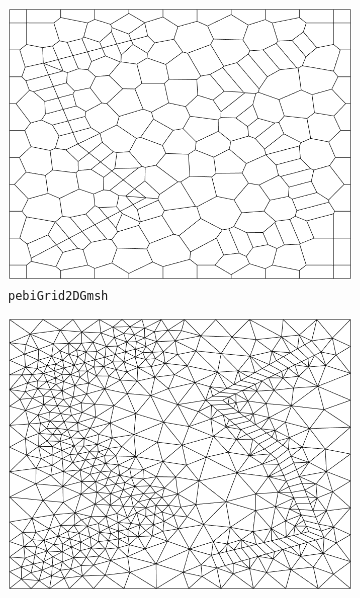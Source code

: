 \begin{figure}[p]
    \centering
    \begin{subfigure}[b]{0.49\textwidth}
        \centering
        \includegraphics[width=\textwidth]{report/Images/Combining software/Demo gmsh4mrst MATLAB/demo_pebiGrid2DGmsh.png}
        \caption{\texttt{pebiGrid2DGmsh}}
        \label{fig:pebiGrid2DGmsh}
    \end{subfigure}
    \begin{subfigure}[b]{0.49\textwidth}
        \centering
        \includegraphics[width=\textwidth]{report/Images/Combining software/Demo gmsh4mrst MATLAB/demo_delaunayGrid2DGmsh.png}

\end{subfigure}
\end{figure}
